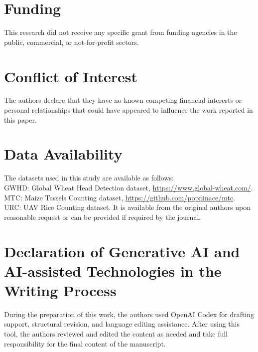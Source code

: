 \documentclass[a4paper,fleqn]{cas-sc}
\begin{document}
\section*{Funding}
\noindent This research did not receive any specific grant from funding agencies in the public, commercial, or not-for-profit sectors.

\section*{Conflict of Interest}
\noindent The authors declare that they have no known competing financial interests or personal relationships that could have appeared to influence the work reported in this paper.

\section*{Data Availability}
\noindent The datasets used in this study are available as follows: \\
GWHD: Global Wheat Head Detection dataset, \url{https://www.global-wheat.com/}. \\
MTC: Maize Tassels Counting dataset, \url{https://github.com/poppinace/mtc}. \\
URC: UAV Rice Counting dataset. It is available from the original authors upon reasonable request or can be provided if required by the journal.

\section*{Declaration of Generative AI and AI-assisted Technologies in the Writing Process}
\noindent During the preparation of this work, the authors used OpenAI Codex for drafting support, structural revision, and language editing assistance. After using this tool, the authors reviewed and edited the content as needed and take full responsibility for the final content of the manuscript.



\end{document}
